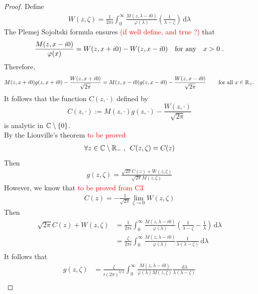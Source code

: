 \documentclass[11pt]{amsart}
\newcommand{\diff}{\,\mathrm{d}}
\begin{document}
\begin{proof}
Define
\begin{align*}
    W(z, \zeta) = \frac{1}{2\pi i}\int_0^\infty  \frac{M(z,\lambda-i0)}{\varphi(\lambda)}\left( \frac{1}{\lambda-\zeta}\right) \diff \lambda 
\end{align*}
The Plemej Sojoltski formula ensures \textcolor{red}{(if well define, and true ?)} that 
\begin{align*}
    \frac{M(z,x-i0)}{\varphi(x)}
    = 
    W(z,x+i0) - W(z,x-i0)
    \quad \text{for any} \quad
    x > 0
    \; .
\end{align*}
Therefore, 
\begin{align*}
    M(z,x+i0)g(z, x+i0) -\frac{W(z,x+i0)}{\sqrt{2\pi}} = M(z,x-i0)g(z, x-i0) - \frac{W(z,x-i0)}{\sqrt{2\pi}} \, \qquad \text{for all $x\in\mathbb{R}_+$}.
\end{align*}
It follows that the function $C(z,\cdot)$ defined by 
$$ C(z,\cdot) := M(z,\cdot)g(z,\cdot) - \frac{W(z,\cdot)}{\sqrt{2\pi}}$$
is analytic in $\mathbb{C} \setminus \{0\}$.\\

By the Liouville's theorem \textcolor{red}{to be proved}
\begin{align*}
    \forall z \in \mathbb{C} \setminus \mathbb{R}_-
    \; , \enspace
    C(z,\zeta) = C(z)
\end{align*}
Then 
\begin{align}
    g(z,\zeta) = \frac{\sqrt{2\pi}C(z)+W(z,\zeta)}{\sqrt{2\pi}M(z,\zeta)}
\end{align}
However, we know that \textcolor{red}{to be proved from C3}
\begin{align}
C(z) = -\frac{1}{\sqrt{2\pi}}\lim_{\zeta \to 0}W(z,\zeta)
\end{align}
Then 
\begin{align*}
    \sqrt{2\pi}C(z) + W(z,\zeta)
    &= 
    \frac{1}{2\pi i}\int_0^\infty  \frac{M(z,\lambda-i0)}{\varphi(\lambda)}\left( \frac{1}{\lambda-\zeta}-\frac{1}{\lambda}\right) \diff \lambda \\
    &= 
    \frac{\zeta}{2\pi i}\int_0^\infty  \frac{M(z,\lambda-i0)}{\varphi(\lambda)} \frac{1}{\lambda(\lambda-\zeta)} \diff \lambda \\
\end{align*}
It follows that 
\begin{align*}
    g(z,\zeta) 
    &= 
    \frac{\zeta}{i(2\pi)^{3/2}}\int_0^\infty  \frac{M(z,\lambda-i0)}{\varphi(\lambda)M(z,\zeta)} \frac{\diff \lambda}{\lambda(\lambda-\zeta)} \\
\end{align*}
\end{proof}
\end{document}
